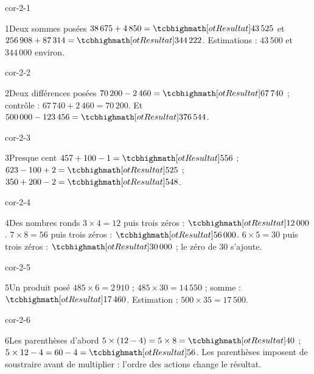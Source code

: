 \clearpage\pagestyle{otMain}\setlength{\otBlocEspacement}{2.5mm}\fontsize{11}{15}\selectfont{}
\begin{blocLivre}{cor-2-1}\begin{corrige}{1}{Deux sommes posées}
$38\,675+4\,850=\res{43\,525}$ et $256\,908+87\,314=\res{344\,222}$. Estimations : $43\,500$ et $344\,000$ environ.
\end{corrige}\end{blocLivre}
\begin{blocLivre}{cor-2-2}\begin{corrige}{2}{Deux différences posées}
$70\,200-2\,460=\res{67\,740}$ ; contrôle : $67\,740+2\,460=70\,200$. Et $500\,000-123\,456=\res{376\,544}$.
\end{corrige}\end{blocLivre}
\begin{blocLivre}{cor-2-3}\begin{corrige}{3}{Presque cent}
$457+100-1=\res{556}$ ; $623-100+2=\res{525}$ ; $350+200-2=\res{548}$.
\end{corrige}\end{blocLivre}
\begin{blocLivre}{cor-2-4}\begin{corrige}{4}{Des nombres ronds}
$3\times4=12$ puis trois zéros : $\res{12\,000}$. $7\times8=56$ puis trois zéros : $\res{56\,000}$. $6\times5=30$ puis trois zéros : $\res{30\,000}$ ; le zéro de 30 s’ajoute.
\end{corrige}\end{blocLivre}
\begin{blocLivre}{cor-2-5}\begin{corrige}{5}{Un produit posé}
$485\times6=2\,910$ ; $485\times30=14\,550$ ; somme : $\res{17\,460}$. Estimation : $500\times35=17\,500$.
\end{corrige}\end{blocLivre}
\begin{blocLivre}{cor-2-6}\begin{corrige}{6}{Les parenthèses d’abord}
$5\times(12-4)=5\times8=\res{40}$ ; $5\times12-4=60-4=\res{56}$. Les parenthèses imposent de soustraire avant de multiplier : l’ordre des actions change le résultat.
\end{corrige}\end{blocLivre}
